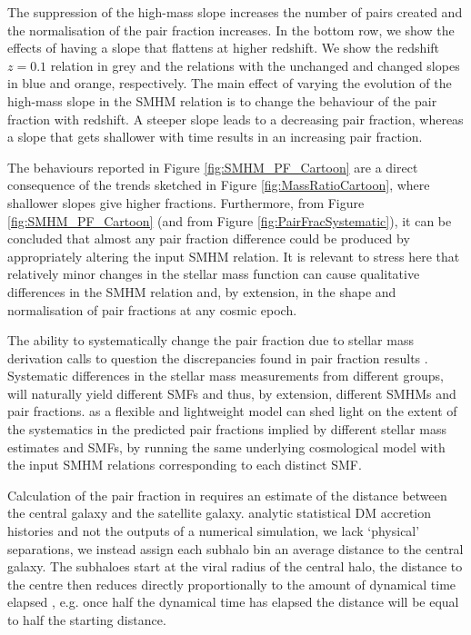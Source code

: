 The suppression of the high-mass slope increases the number of pairs created and the normalisation of the pair fraction increases. 
In the bottom row, we show the effects of having a slope that flattens at higher redshift. 
We show the redshift $z=0.1$ relation in grey and the relations with the unchanged and changed slopes in blue and orange, respectively. 
The main effect of varying the evolution of the high-mass slope in the SMHM relation is to change the behaviour of the pair fraction with redshift. 
A steeper slope leads to a decreasing pair fraction, whereas a slope that gets shallower with time results in an increasing pair fraction.

The behaviours reported in Figure \ref{fig:SMHM_PF_Cartoon} are a direct consequence of the trends sketched in Figure \ref{fig:MassRatioCartoon}, where shallower slopes give higher fractions. 
Furthermore, from Figure \ref{fig:SMHM_PF_Cartoon} (and from Figure \ref{fig:PairFracSystematic}), it can be concluded that almost any pair fraction difference could be produced by appropriately altering the input SMHM relation. 
It is relevant to stress here that relatively minor changes in the stellar mass function can cause qualitative differences in the SMHM relation and, by extension, in the shape and normalisation of pair fractions at any cosmic epoch.

The ability to systematically change the pair fraction due to stellar mass derivation calls to question the discrepancies found in pair fraction results \citep[e.g.][]{Man2016RESOLVING03}. 
Systematic differences in the stellar mass measurements from different groups, will naturally yield different SMFs and thus, by extension, different SMHMs and pair fractions.  
\steel as a flexible and lightweight model can shed light on the extent of the systematics in the predicted pair fractions implied by different stellar mass estimates and SMFs, by running the same underlying cosmological model with the input SMHM relations corresponding to each distinct SMF.

Calculation of the pair fraction in \steel requires an estimate of the distance between the central galaxy and the satellite galaxy. analytic statistical DM accretion histories and not the outputs of a numerical simulation, we lack `physical' separations, we instead assign each subhalo bin an average distance to the central galaxy. 
The subhaloes start at the viral radius of the central halo, the distance to the centre then reduces directly proportionally to the amount of dynamical time elapsed \citep{Guo2011FromCosmology}, e.g. once half the dynamical time has elapsed the distance will be equal to half the starting distance.

